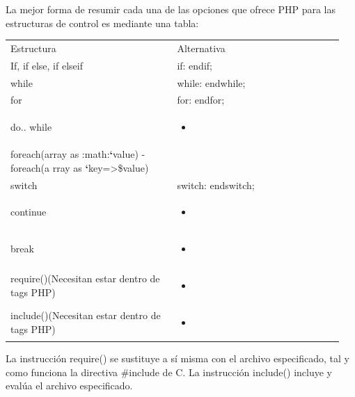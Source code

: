 \documentclass[a5paper,10pt,spanish]{sphinxmanual}
\begin{document}
La mejor forma de resumir cada una de las opciones que ofrece PHP para
las estructuras de control es mediante una tabla:

\begin{tabular}{|p{0.475\linewidth}|p{0.475\linewidth}|}
\hline

Estructura
 & 
Alternativa
\\

If, if else, if elseif
 & 
if: endif;
\\

while
 & 
while: endwhile;
\\

for
 & 
for: endfor;
\\

do.. while
 & \begin{itemize}
\item {} 
\end{itemize}
\\

foreach(array as
:math:{\color{red}\bfseries{}{}`}value)                     - foreach(a
rray as {\color{red}\bfseries{}{}`}key=\textgreater{}\$value)
 & \\

switch
 & 
switch: endswitch;
\\

continue
 & \begin{itemize}
\item {} 
\end{itemize}
\\

break
 & \begin{itemize}
\item {} 
\end{itemize}
\\

require()(Necesitan estar dentro de tags PHP)
 & \begin{itemize}
\item {} 
\end{itemize}
\\

include()(Necesitan estar dentro de tags PHP)
 & \begin{itemize}
\item {} 
\end{itemize}
\\
\hline\end{tabular}


La instrucción require() se
sustituye a sí misma con el archivo especificado, tal y como funciona la
directiva \#include de C. La instrucción
include() incluye y evalúa el
archivo especificado.
\end{document}
